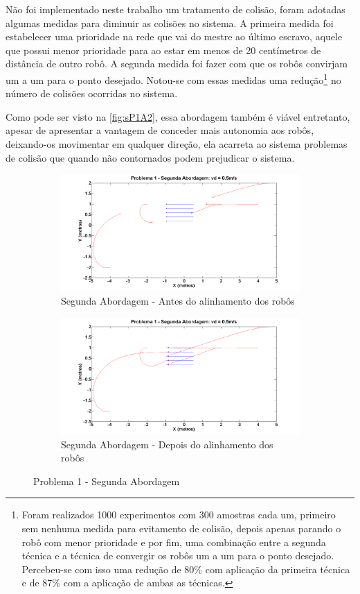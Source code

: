 Não foi implementado neste trabalho um tratamento de colisão, foram adotadas algumas medidas para diminuir as colisões no sistema. A primeira medida foi estabelecer uma prioridade na rede que vai do mestre ao último escravo, aquele que possui menor prioridade para ao estar em menos de 20 centímetros de distância de outro robô. A segunda medida foi fazer com que os robôs convirjam um a um para o ponto desejado. Notou-se com essas medidas uma redução\footnote{Foram realizados 1000 experimentos com 300 amostras cada um, primeiro sem nenhuma medida para evitamento de colisão, depois apenas parando o robô com menor prioridade e por fim, uma combinação entre a segunda técnica e a técnica de convergir os robôs um a um para o ponto desejado. Percebeu-se com isso uma redução de 80\% com aplicação da primeira técnica e de 87\% com a aplicação de ambas as técnicas.} no número de colisões ocorridas no sistema. 

Como pode ser visto na \autoref{fig:sP1A2}, essa abordagem também é viável entretanto, apesar de apresentar a vantagem de conceder mais autonomia aos robôs, deixando-os movimentar em qualquer direção, ela acarreta ao sistema problemas de colisão que quando não contornados podem prejudicar o sistema.

\begin{figure}[!htb]
	\centering
	\begin{subfigure}{1.0\textwidth}
		\centering
		\includegraphics[width=.9\linewidth]{./04-figuras/Simulacoes/Problema1-Abordagem1/P1A2Inicio}
		\caption{Segunda Abordagem - Antes do alinhamento dos robôs}
		\label{fig:P1A2Ini}
	\end{subfigure}
	\begin{subfigure}{1.0\textwidth}
		\centering
		\includegraphics[width=.9\linewidth]{./04-figuras/Simulacoes/Problema1-Abordagem1/P1A2Fim}
		\caption{Segunda Abordagem - Depois do alinhamento dos robôs}
		\label{fig:P1A2Fim}
	\end{subfigure}
	\caption{Problema 1 - Segunda Abordagem}
	\label{fig:sP1A2}
\end{figure}

